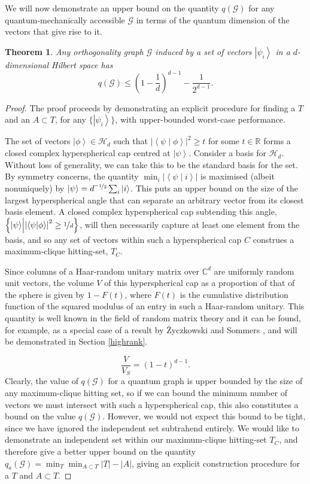 \documentclass{amsart}
\newtheorem{thm}{Theorem}
\theoremstyle{definition}
\newcommand{\ket}[1]{{\left\vert{#1}\right\rangle}}
\newcommand{\braket}[2]{{\left< {#1} \middle\vert {#2}\right>}}
\newcommand{\sprod}[2]{\left|\left< {#1} \middle| {#2} \right>\right|}
\begin{document}
We will now demonstrate an upper bound on the quantity $q(\mathcal{G})$ for any quantum-mechanically accessible $\mathcal{G}$ in terms of the quantum dimension of the vectors that give rise to it.
\begin{thm}\label{main}
Any orthogonality graph $\mathcal{G}$ induced by a set of vectors $\ket{\psi_i}$ in a $d$-dimensional Hilbert space has
\begin{equation}
q(\mathcal{G}) \leq \left(1-\frac1d\right)^{d-1}-\frac{1}{2^{d-1}}.
\end{equation}
\end{thm}
\begin{proof}
The proof proceeds by demonstrating an explicit procedure for finding a $T$ and an $A\subset T$, for any $\{\ket{\psi_i}\}$, with upper-bounded worst-case performance.

The set of vectors $\ket{\phi}\in\mathcal{H}_d$ such that $\sprod{\psi}{\phi}^2\geq t$ for some $t\in\mathbb{R}$ forms a closed complex hyperspherical cap centred at $\ket{\psi}$. Consider a basis for $\mathcal{H}_d$. Without loss of generality, we can take this to be the standard basis for the set. By symmetry concerns, the quantity $\min_i \left|\braket{\psi}{i}\right|$ is maximised (albeit nonuniquely) by $\ket{\psi}=d^{\nicefrac{-1}{2}}\sum_i\ket{i}$. This puts an upper bound on the size of the largest hyperspherical angle that can separate an arbitrary vector from its closest basis element. A closed complex hyperspherical cap subtending this angle, $\left\{\ket{\psi}\middle|\sprod{\psi}{\phi}^2\geq \nicefrac{1}{d}\right\}$, will then necessarily capture at least one element from the basis, and so any set of vectors within such a hyperspherical cap $C$ construes a maximum-clique hitting-set, $T_C$.

Since columns of a Haar-random unitary matrix over $\mathbb{C}^d$ are uniformly random unit vectors, the volume $V$ of this hyperspherical cap as a proportion of that of the sphere is given by $1-F(t)$, where $F(t)$ is the cumulative distribution function of the squared  modulus of an entry in such a Haar-random unitary. This quantity is well known in the field of random matrix theory and it can be found, for example, as a special case of a result by \.{Z}yczkowski and Sommers \cite{Zycz2000}, and will be demonstrated in Section \ref{highrank}.

\begin{equation}
\frac{V}{V_S}=\left(1-t \right)^{d-1}.
\end{equation}
Clearly, the value of $q(\mathcal{G})$ for a quantum graph is upper bounded by the size of any maximum-clique hitting set, so if we can bound the minimum number of vectors we must intersect with such a hyperspherical cap, this also constitutes a bound on the value $q(\mathcal{G})$. However, we would not expect this bound to be tight, since we have ignored the independent set subtrahend entirely. We would like to demonstrate an independent set within our maximum-clique hitting-set $T_C$, and therefore give a better upper bound on the quantity $q_a(\mathcal{G})=\min_T \min_{A\subset T} |T|-|A|$, giving an explicit construction procedure for a $T$ and $A\subset T$.


\end{proof}
\end{document}
